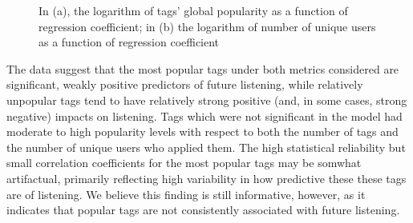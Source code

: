   \begin{figure}[t]
    \hfill
    \caption{In (a), the logarithm of tags' global popularity as a function of regression coefficient; in (b) the logarithm of number of unique users as a function of regression coefficient}
    \label{fig:secondPlotSet}
    \vspace{-1em}
  \end{figure}

The data suggest that the most popular tags under both metrics considered are significant, weakly positive predictors of future listening, while relatively unpopular tags tend to have relatively strong positive (and, in some cases, strong negative) impacts on listening. Tags which were not significant in the model had moderate to high popularity levels with respect to both the number of tags and the number of unique users who applied them. The high statistical reliability but small correlation coefficients for the most popular tags may be somwhat artifactual, primarily reflecting high variability in how predictive these these tags are of listening. We believe this finding is still informative, however, as it indicates that popular tags are not consistently associated with future listening.

